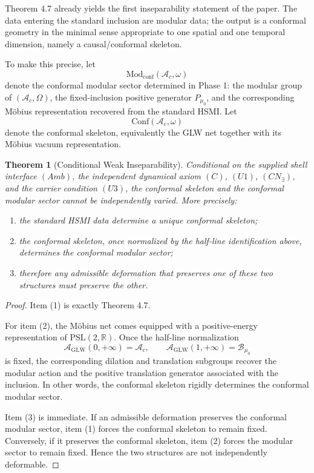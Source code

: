 \documentclass[12pt]{article}
\newtheorem{theorem}{Theorem}[section]
\theoremstyle{definition}
\theoremstyle{remark}
\newcommand{\tightlist}{%
  \setlength{\itemsep}{0pt}\setlength{\parskip}{0pt}}
\begin{document}
Theorem 4.7 already yields the first inseparability statement of the
paper. The data entering the standard inclusion are modular data; the
output is a conformal geometry in the minimal sense appropriate to one
spatial and one temporal dimension, namely a causal/conformal skeleton.

To make this precise, let \[
\mathrm{Mod}_{\mathrm{conf}}(\mathcal{A}_c,\omega)
\] denote the conformal modular sector determined in Phase 1: the
modular group of \((\mathcal{A}_c,\Omega)\), the fixed-inclusion
positive generator \(P_{\mu_0}\), and the corresponding Möbius
representation recovered from the standard HSMI\@. Let \[
\mathrm{Conf}(\mathcal{A}_c,\omega)
\] denote the conformal skeleton, equivalently the GLW net together with
its Möbius vacuum representation.

\begin{theorem}[Conditional Weak Inseparability]\label{thm:4.8}
Conditional on the supplied shell interface \((Amb)\), the independent
dynamical axiom \((C)\), \((U1)\), \((CN_\exists)\), and the carrier
condition \((U3)\), the conformal skeleton and the conformal modular
sector cannot be independently varied. More precisely:

\begin{enumerate}
\def\labelenumi{\arabic{enumi}.}
\tightlist
\item
  the standard HSMI data determine a unique conformal skeleton;
\item
  the conformal skeleton, once normalized by the half-line
  identification above, determines the conformal modular sector;
\item
  therefore any admissible deformation that preserves one of these two
  structures must preserve the other.
\end{enumerate}
\end{theorem}

\begin{proof}
Item (1) is exactly Theorem 4.7.

For item (2), the Möbius net comes equipped with a positive-energy
representation of \(\mathrm{PSL}(2,\mathbb{R})\). Once the half-line
normalization \[
\mathcal{A}_{\mathrm{GLW}}(0,+\infty)=\mathcal{A}_c,
\qquad
\mathcal{A}_{\mathrm{GLW}}(1,+\infty)=\mathcal{B}_{\mu_0}
\] is fixed, the corresponding dilation and translation subgroups
recover the modular action and the positive translation generator
associated with the inclusion. In other words, the conformal skeleton
rigidly determines the conformal modular sector.

Item (3) is immediate. If an admissible deformation preserves the
conformal modular sector, item (1) forces the conformal skeleton to
remain fixed. Conversely, if it preserves the conformal skeleton, item
(2) forces the modular sector to remain fixed. Hence the two structures
are not independently deformable.
\end{proof}
\end{document}
